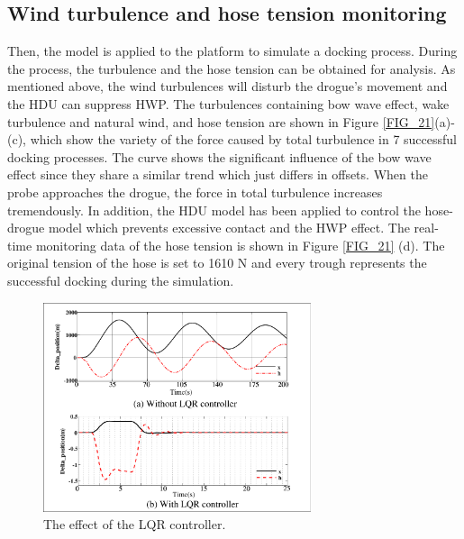 \subsection{ Wind turbulence and hose tension monitoring}\label{sec5.4.2}
Then, the model is applied to the platform to simulate a docking process. During the process, the turbulence and the hose tension can be obtained for analysis. As mentioned above, the wind turbulences will disturb the drogue's movement and the HDU can suppress HWP. The turbulences containing bow wave effect, wake turbulence and natural wind, and hose tension are shown in Figure \ref{FIG_21}(a)-(c), which show the variety of the force caused by total turbulence in 7 successful docking processes. The curve shows the significant influence of the bow wave effect since they share a similar trend which just differs in offsets. When the probe approaches the drogue, the force in total turbulence increases tremendously. In addition, the HDU model has been applied to control the hose-drogue model which prevents excessive contact and the HWP effect. The real-time monitoring data of the hose tension is shown in Figure \ref{FIG_21} (d). The original tension of the hose is set to 1610 N and every trough represents the successful docking during the simulation. 



\begin{figure}[hp]
	\centering
	\includegraphics[width=0.7\textwidth]{Figures/Figs_Ch5/Fig20.pdf}
	\caption{The effect of the LQR controller.}\label{FIG_20}
\end{figure}

